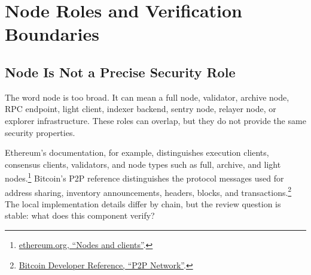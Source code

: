 \section{Node Roles and Verification Boundaries}

\subsection{Node Is Not a Precise Security Role}

The word node is too broad. It can mean a full node, validator, archive node, RPC endpoint, light client, indexer backend, sentry node, relayer node, or explorer infrastructure. These roles can overlap, but they do not provide the same security properties.

Ethereum's documentation, for example, distinguishes execution clients, consensus clients, validators, and node types such as full, archive, and light nodes.\footnote{\href{https://ethereum.org/developers/docs/nodes-and-clients/}{ethereum.org, ``Nodes and clients''}.} Bitcoin's P2P reference distinguishes the protocol messages used for address sharing, inventory announcements, headers, blocks, and transactions.\footnote{\href{https://developer.bitcoin.org/reference/p2p\_networking.html}{Bitcoin Developer Reference, ``P2P Network''}.} The local implementation details differ by chain, but the review question is stable: what does this component verify?

